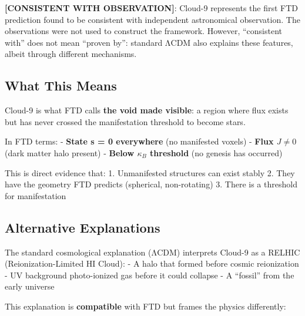 \documentclass[
  11pt,
  letterpaper,
  twoside,
  openany]{book}
\makeatletter
\let\orig@subsection\subsection
\renewcommand{\subsection}{\needspace{6\baselineskip}\orig@subsection}
\makeatother
\begin{document}
\begin{tcolorbox}[enhanced jigsaw, colbacktitle=quarto-callout-note-color!10!white, titlerule=0mm, bottomtitle=1mm, bottomrule=.15mm, colback=white, arc=.35mm, breakable, toprule=.15mm, title=\textcolor{quarto-callout-note-color}{\faInfo}\hspace{0.5em}{Epistemic Status}, rightrule=.15mm, coltitle=black, leftrule=.75mm, colframe=quarto-callout-note-color-frame, toptitle=1mm, opacityback=0, opacitybacktitle=0.6, left=2mm]

\textbf{{[}CONSISTENT WITH OBSERVATION{]}}: Cloud-9 represents the first
FTD prediction found to be consistent with independent astronomical
observation. The observations were not used to construct the framework.
However, ``consistent with'' does not mean ``proven by'': standard ΛCDM
also explains these features, albeit through different mechanisms.

\end{tcolorbox}

\subsection{What This Means}\label{what-this-means}

Cloud-9 is what FTD calls \textbf{the void made visible}: a region where
flux exists but has never crossed the manifestation threshold to become
stars.

In FTD terms: - \textbf{State s = 0 everywhere} (no manifested voxels) -
\textbf{Flux \(J \neq 0\)} (dark matter halo present) - \textbf{Below
\(\kappa_B\) threshold} (no genesis has occurred)

This is direct evidence that: 1. Unmanifested structures can exist
stably 2. They have the geometry FTD predicts (spherical, non-rotating)
3. There is a threshold for manifestation

\subsection{Alternative Explanations}\label{alternative-explanations}

The standard cosmological explanation (ΛCDM) interprets Cloud-9 as a
RELHIC (Reionization-Limited HI Cloud): - A halo that formed before
cosmic reionization - UV background photo-ionized gas before it could
collapse - A ``fossil'' from the early universe

This explanation is \textbf{compatible} with FTD but frames the physics
differently:
\end{document}

